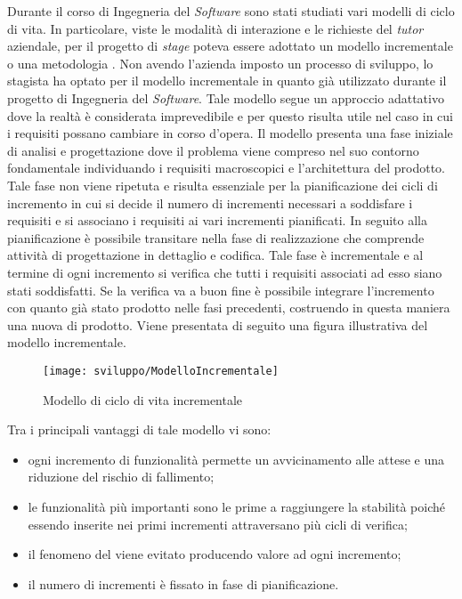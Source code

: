 Durante il corso di Ingegneria del \textit{Software} sono stati studiati vari modelli di ciclo di vita. In particolare, viste le modalità di interazione e le richieste del \textit{tutor} aziendale, per il progetto di \textit{stage} poteva essere adottato un modello incrementale o una metodologia . Non avendo l'azienda imposto un processo di sviluppo, lo stagista ha optato per il modello incrementale in quanto già utilizzato durante il progetto di Ingegneria del \textit{Software}. Tale modello segue un approccio adattativo dove la realtà è considerata imprevedibile e per questo risulta utile nel caso in cui i requisiti possano cambiare in corso d'opera. Il modello presenta una fase iniziale di analisi e progettazione dove il problema viene compreso nel suo contorno fondamentale individuando i requisiti macroscopici e l'architettura del prodotto. Tale fase non viene ripetuta e risulta essenziale per la pianificazione dei cicli di incremento in cui si decide il numero di incrementi necessari a soddisfare i requisiti e si associano i requisiti ai vari incrementi pianificati. In seguito alla pianificazione è possibile transitare nella fase di realizzazione che comprende attività di progettazione in dettaglio e codifica. Tale fase è incrementale e al termine di ogni incremento si verifica che tutti i requisiti associati ad esso siano stati soddisfatti. Se la verifica va a buon fine è possibile integrare l'incremento con quanto già stato prodotto nelle fasi precedenti, costruendo in questa maniera una nuova  di prodotto. Viene presentata di seguito una figura illustrativa del modello incrementale.

\begin{figure}[!h] 
    \centering 
    \texttt{[image: sviluppo/ModelloIncrementale]} 
    \caption{Modello di ciclo di vita incrementale}
\end{figure}

\hspace{-15pt}Tra i principali vantaggi di tale modello vi sono:
\begin{itemize}
	\item ogni incremento di funzionalità permette un avvicinamento alle attese e una riduzione del rischio di fallimento;
	\item le funzionalità più importanti sono le prime a raggiungere la stabilità poiché essendo inserite nei primi incrementi attraversano più cicli di verifica;
	\item il fenomeno del  viene evitato producendo valore ad ogni incremento;
	\item il numero di incrementi è fissato in fase di pianificazione.
\end{itemize}

